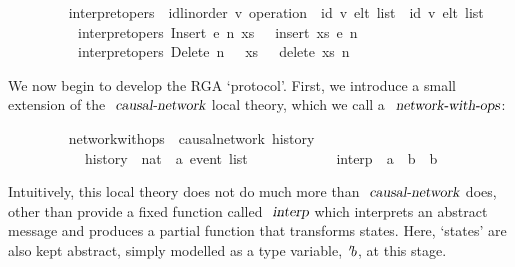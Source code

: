 \documentclass[acmlarge,review,anonymous]{acmart}\settopmatter{printfolios=true}
\begin{document}
\begin{isabellebody}
\ \ \ \ \ \ \ \  interpret{\isacharunderscore}opers\ {\isacharcolon}{\isacharcolon}\ {\isachardoublequoteopen}{\isacharparenleft}{\isacharprime}id{\isacharcolon}{\isacharcolon}linorder{\isacharcomma}\ {\isacharprime}v{\isacharparenright}\ operation\ {\isasymRightarrow}\ {\isacharparenleft}{\isacharprime}id{\isacharcomma}\ {\isacharprime}v{\isacharparenright}\ elt\ list\ {\isasymrightharpoonup}\ {\isacharparenleft}{\isacharprime}id{\isacharcomma}\ {\isacharprime}v{\isacharparenright}\ elt\ list{\isachardoublequoteclose}\ {\isacharparenleft}{\isachardoublequoteopen}{\isasymlangle}{\isacharunderscore}{\isasymrangle}{\isachardoublequoteclose}\ {\isacharbrackleft}{}{\isacharbrackright}\ {}{}{}{}{\isacharparenright}\ \isanewline
\ \ \ \ \ \ \ \ \ \ {\isachardoublequoteopen}interpret{\isacharunderscore}opers\ {\isacharparenleft}Insert\ e\ n{\isacharparenright}\ xs\ \ {\isacharequal}\ insert\ xs\ e\ n{\isachardoublequoteclose}\ {\isacharbar}\isanewline
\ \ \ \ \ \ \ \ \ \ {\isachardoublequoteopen}interpret{\isacharunderscore}opers\ {\isacharparenleft}Delete\ n{\isacharparenright}\ \ \ xs\ \ {\isacharequal}\ delete\ xs\ n{\isachardoublequoteclose}
\end{isabellebody}
\vspace{\baselineskip}
We now begin to develop the RGA `protocol'.
First, we introduce a small extension of the $\isa{causal-network}$ local theory, which we call a $\isa{network-with-ops}$:
\\
\begin{isabellebody}
\ \ \ \ \ \ \ \  network{\isacharunderscore}with{\isacharunderscore}ops\ {\isacharequal}\ causal{\isacharunderscore}network\ history\isanewline
\ \ \ \ \ \ \ \ \ \ \ history\ {\isacharcolon}{\isacharcolon}\ {\isachardoublequoteopen}nat\ {\isasymRightarrow}\ {\isacharprime}a\ event\ list{\isachardoublequoteclose}\ {\isacharplus}\isanewline
\ \ \ \ \ \ \ \ \ \ \ interp\ {\isacharcolon}{\isacharcolon}\ {\isachardoublequoteopen}{\isacharprime}a\ {\isasymRightarrow}\ {\isacharprime}b\ {\isasymrightharpoonup}\ {\isacharprime}b{\isachardoublequoteclose}
\end{isabellebody}
\vspace{\baselineskip}
Intuitively, this local theory does not do much more than $\isa{causal-network}$ does, other than provide a fixed function called $\isa{interp}$ which interprets an abstract message and produces a partial function that transforms states.
Here, `states' are also kept abstract, simply modelled as a type variable, ${\emph{$\mskip2mu{'}\mskip-2mu$}}b$, at this stage.
\end{document}
